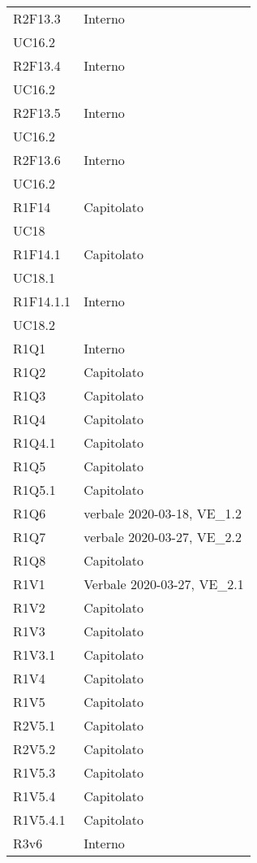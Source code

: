 \begin{longtable}{ 
		>{\centering}p{}
		>{\centering}p{}}
	R2F13.3	& Interno\\	UC16.2 \tabularnewline
	R2F13.4	& Interno\\	UC16.2 \tabularnewline
	R2F13.5	& Interno\\	UC16.2 \tabularnewline
	R2F13.6	& Interno\\	UC16.2 \tabularnewline
	R1F14	& Capitolato\\	UC18 \tabularnewline
	R1F14.1	& Capitolato\\	UC18.1 \tabularnewline
	R1F14.1.1 &	Interno\\	UC18.2 \tabularnewline
	R1Q1& 	Interno	 \tabularnewline
	R1Q2 &	Capitolato	 \tabularnewline
	R1Q3 &	Capitolato	 \tabularnewline
	R1Q4 &	Capitolato	 \tabularnewline
	R1Q4.1 &	Capitolato	\tabularnewline
	R1Q5 &	Capitolato	\tabularnewline
	R1Q5.1	& Capitolato\tabularnewline
	R1Q6 &	verbale 2020-03-18, VE\_1.2 \tabularnewline 	
	R1Q7& 	verbale 2020-03-27, VE\_2.2	 \tabularnewline
	R1Q8 &	Capitolato	 \tabularnewline
	R1V1 &	Verbale 2020-03-27, VE\_2.1	 \tabularnewline
	R1V2 &	Capitolato	 \tabularnewline
	R1V3 &	Capitolato	 \tabularnewline
	R1V3.1 &	Capitolato	 \tabularnewline
	R1V4 &	Capitolato	\tabularnewline
	R1V5 &	Capitolato	\tabularnewline
	R2V5.1 &	Capitolato	\tabularnewline
	R2V5.2 &	Capitolato	\tabularnewline
	R1V5.3 &	Capitolato	\tabularnewline
	R1V5.4 &	Capitolato	\tabularnewline
	R1V5.4.1 &	Capitolato	\tabularnewline
	R3v6 &	Interno	
	
	
\end{longtable}	
